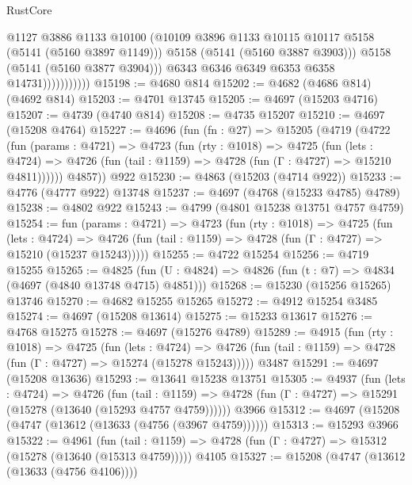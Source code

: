 \begin{lexlean}{RustCore}
\begin{coremodule}
                              @1127
                              @3886
                              @1133
                              @10100
                              (@10109 @3896 @1133 @10115 @10117 @5158 (@5141 (@5160 @3897 @1149)))
                              @5158
                              (@5141 (@5160 @3887 @3903)))
                            @5158
                            (@5141 (@5160 @3877 @3904)))
                          @6343
                          @6346
                          @6349
                          @6353
                          @6358
                          @14731)))))))))))
@15198 := @4680 @814
@15202 := @4682 (@4686 @814) (@4692 @814)
@15203 := @4701 @13745
@15205 := @4697 (@15203 @4716)
@15207 := @4739 (@4740 @814)
@15208 := @4735 @15207
@15210 := @4697 (@15208 @4764)
@15227 := @4696
    (fun (fn : @27) =>
    @15205
      (@4719
        (@4722
          (fun (params : @4721) =>
          @4723
            (fun (rty : @1018) =>
            @4725
              (fun (lets : @4724) =>
              @4726 (fun (tail : @1159) => @4728 (fun (Γ : @4727) => @15210 @4811))))))
        @4857))
    @922
@15230 := @4863 (@15203 (@4714 @922))
@15233 := @4776 (@4777 @922) @13748
@15237 := @4697 (@4768 (@15233 @4785) @4789)
@15238 := @4802 @922
@15243 := @4799 (@4801 @15238 @13751 @4757 @4759)
@15254 := fun (params : @4721) =>
  @4723
    (fun (rty : @1018) =>
    @4725
      (fun (lets : @4724) =>
      @4726 (fun (tail : @1159) => @4728 (fun (Γ : @4727) => @15210 (@15237 @15243)))))
@15255 := @4722 @15254
@15256 := @4719 @15255
@15265 := @4825
    (fun (U : @4824) => @4826 (fun (t : @7) => @4834 (@4697 (@4840 @13748 @4715) @4851)))
@15268 := @15230 (@15256 @15265) @13746
@15270 := @4682 @15255 @15265
@15272 := @4912 @15254 @3485
@15274 := @4697 (@15208 @13614)
@15275 := @15233 @13617
@15276 := @4768 @15275
@15278 := @4697 (@15276 @4789)
@15289 := @4915
    (fun (rty : @1018) =>
    @4725
      (fun (lets : @4724) =>
      @4726 (fun (tail : @1159) => @4728 (fun (Γ : @4727) => @15274 (@15278 @15243)))))
    @3487
@15291 := @4697 (@15208 @13636)
@15293 := @13641 @15238 @13751
@15305 := @4937
    (fun (lets : @4724) =>
    @4726
      (fun (tail : @1159) =>
      @4728 (fun (Γ : @4727) => @15291 (@15278 (@13640 (@15293 @4757 @4759))))))
    @3966
@15312 := @4697 (@15208 (@4747 (@13612 (@13633 (@4756 (@3967 @4759))))))
@15313 := @15293 @3966
@15322 := @4961
    (fun (tail : @1159) => @4728 (fun (Γ : @4727) => @15312 (@15278 (@13640 (@15313 @4759)))))
    @4105
@15327 := @15208 (@4747 (@13612 (@13633 (@4756 @4106))))

\end{coremodule}
\end{lexlean}
